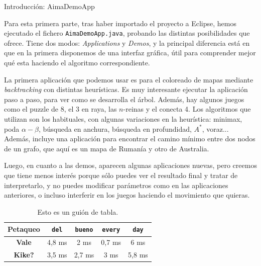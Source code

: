 \documentclass[11pt, a4paper, spanish, openright, twoside]{book}
\begin{document}
\begin{section}{Introducción: AimaDemoApp}

Para esta primera parte, tras haber importado el proyecto a Eclipse, hemos ejecutado el fichero \texttt{AimaDemoApp.java}, probando las distintas posibilidades que ofrece. Tiene dos modos: \textit{Applications} y \textit{Demos}, y la principal diferencia está en que en la primera disponemos de una interfaz gráfica, útil para comprender mejor qué esta haciendo el algoritmo correspondiente. 

La primera aplicación que podemos usar es para el coloreado de mapas mediante \textit{backtracking} con distintas heurísticas. Es muy interesante ejecutar la aplicación paso a paso, para ver como se desarrolla el árbol. Además, hay algunos juegos como el puzzle de 8, el 3 en raya, las $n$-reinas y el conecta 4. Los algoritmos que utilizan son los habituales, con algunas variaciones en la heurística: minimax, poda $\alpha-\beta$, búsqueda en anchura, búsqueda en profundidad, $A^*$, voraz... Además, incluye una aplicación para encontrar el camino mínimo entre dos nodos de un grafo, que aquí es un mapa de Rumanía y otro de Australia. %

Luego, en cuanto a las demos, aparecen algunas aplicaciones nuevas, pero creemos que tiene menos interés porque sólo puedes ver el resultado final y tratar de interpretarlo, y no puedes modificar parámetros como en las aplicaciones anteriores, o incluso interferir en los juegos haciendo el movimiento que quieras. 

	\begin{table}	
		\begin{center}
			\begin{tabular}{|c||c|c|c|c|}
				\hline	Petaqueo	& \texttt{del} 	& \texttt{bueno} 	& \texttt{every} & \texttt{day}\\ \hline \hline
				\textbf{Vale} 	&  	4,8 ms	& 	2 ms	 & 	0,7 ms		& 6 ms	  \\ \hline 
				\textbf{Kike?}  	&  	3,5 ms	& 	2,7 ms	 & 	3 ms		& 5,8 ms	 \\ \hline 				
			\end{tabular}
		\caption{Esto es un guión de tabla.}
		\end{center}
	\end{table}

\end{section}
\end{document}
